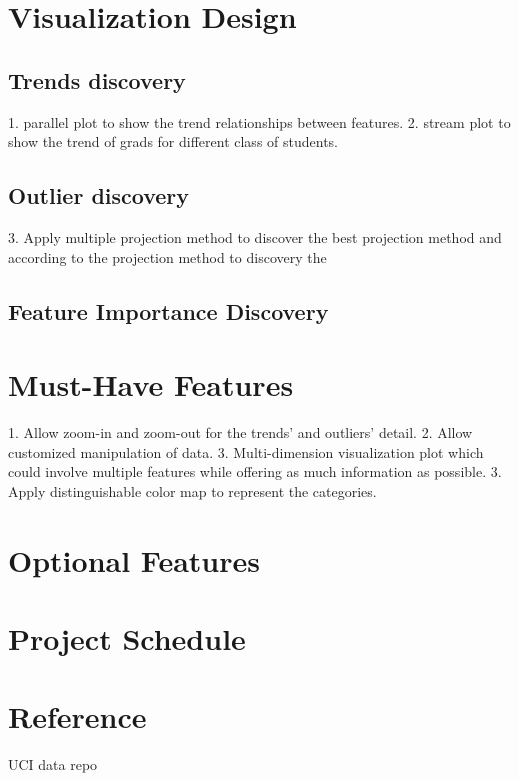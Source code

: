 \documentclass{article}
\begin{document}
\section{Visualization Design}
\subsection{Trends discovery}
1. parallel plot to show the trend relationships between features. 
2. stream plot to show the trend of grads for different class of students.
\subsection{Outlier discovery}
3. Apply multiple projection method to discover the best projection method and according to the projection method to discovery the 
\subsection{Feature Importance Discovery}
\section{Must-Have Features}
1. Allow zoom-in and zoom-out for the trends' and outliers' detail.
2. Allow customized manipulation of data.
3. Multi-dimension visualization plot which could involve multiple features while offering as much information as possible. 
3. Apply distinguishable color map to represent the categories.
\section{Optional Features}
\section{Project Schedule}
\section{Reference}
UCI data repo
\end{document}
